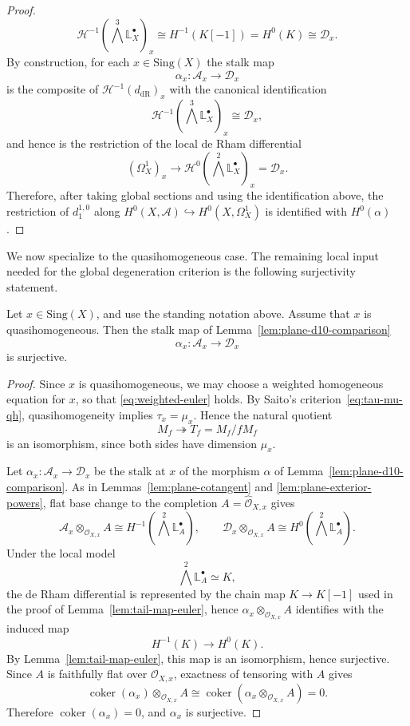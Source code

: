 \documentclass[12pt,reqno]{amsart}
\begin{document}
\begin{proof}
\[
\mathcal H^{-1}\!\left(\bigwedge^3\mathbb{L}^{\bullet}_X\right)_x
\cong
H^{-1}(K[-1])
=
H^0(K)
\cong
\mathcal D_x.
\]
By construction, for each \(x\in \mathrm{Sing}(X)\) the stalk map
\[
\alpha_x:\mathcal A_x\longrightarrow \mathcal D_x
\]
is the composite of \(\mathcal H^{-1}(d_{\mathrm{dR}})_x\) with the canonical identification
\[
\mathcal H^{-1}\!\left(\bigwedge^3\mathbb{L}^{\bullet}_X\right)_x
\cong
\mathcal D_x,
\]
and hence is the restriction of the local de Rham differential
\[
(\Omega_X^1)_x\longrightarrow
\mathcal H^0\!\left(\bigwedge^2\mathbb{L}^{\bullet}_X\right)_x=\mathcal D_x.
\]
Therefore, after taking global sections and using the identification above, the restriction of \(d_1^{1,0}\) along \(H^0(X,\mathcal A)\hookrightarrow H^0(X,\Omega_X^1)\) is identified with \(H^0(\alpha)\).
\end{proof}

We now specialize to the quasihomogeneous case. The remaining local input needed for the global degeneration criterion is the following surjectivity statement.

\begin{lemma}\label{lem:plane-local-surj}
Let \(x\in \mathrm{Sing}(X)\), and use the standing notation above.
Assume that \(x\) is quasihomogeneous. Then the stalk map of Lemma~\ref{lem:plane-d10-comparison}
\[
\alpha_x:\mathcal A_x\longrightarrow \mathcal D_x
\]
is surjective.
\end{lemma}

\begin{proof}
Since \(x\) is quasihomogeneous, we may choose a weighted homogeneous equation for \(x\), so that \eqref{eq:weighted-euler} holds.
By Saito's criterion~\eqref{eq:tau-mu-qh}, quasihomogeneity implies \(\tau_x=\mu_x\). Hence the natural quotient
\[
M_f\twoheadrightarrow T_f=M_f/fM_f
\]
is an isomorphism, since both sides have dimension \(\mu_x\).

Let \(\alpha_x:\mathcal A_x\to \mathcal D_x\) be the stalk at \(x\) of the morphism \(\alpha\) of Lemma~\ref{lem:plane-d10-comparison}. As in Lemmas~\ref{lem:plane-cotangent} and \ref{lem:plane-exterior-powers}, flat base change to the completion \(A=\widehat{\mathcal O}_{X,x}\) gives
\[
\mathcal A_x\otimes_{\mathcal O_{X,x}} A
\cong
H^{-1}\!\left(\bigwedge^2\mathbb{L}^{\bullet}_A\right),
\qquad
\mathcal D_x\otimes_{\mathcal O_{X,x}} A
\cong
H^{0}\!\left(\bigwedge^2\mathbb{L}^{\bullet}_A\right).
\]
Under the local model
\[
\bigwedge^2\mathbb{L}^{\bullet}_A\simeq K,
\]
the de Rham differential is represented by the chain map \(K\to K[-1]\) used in the proof of Lemma~\ref{lem:tail-map-euler}, hence \(\alpha_x\otimes_{\mathcal O_{X,x}} A\) identifies with the induced map
\[
H^{-1}(K)\longrightarrow H^0(K).
\]
By Lemma~\ref{lem:tail-map-euler}, this map is an isomorphism, hence surjective. Since \(A\) is faithfully flat over \(\mathcal O_{X,x}\), exactness of tensoring with \(A\) gives
\[
\operatorname{coker}(\alpha_x)\otimes_{\mathcal O_{X,x}} A
\cong
\operatorname{coker}(\alpha_x\otimes_{\mathcal O_{X,x}} A)=0.
\]
Therefore \(\operatorname{coker}(\alpha_x)=0\), and \(\alpha_x\) is surjective.
\end{proof}
\end{document}
